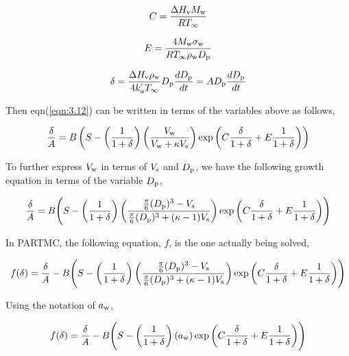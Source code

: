 \documentclass[12pt]{article}
\begin{document}
\begin{equation}\label{eqn:5.5}
C=\frac{\Delta H_{\rm v} M_{\rm w}}{R T_{\infty}}
\end{equation}

\begin{equation}\label{eqn:5.6}
E=\frac{4 M_{\rm w}\sigma_{\rm w}}{R T_{\infty} \rho_{\rm w} D_{\rm p}}
\end{equation}

\begin{equation}\label{eqn:5.7}
\delta=\frac{\Delta H_{\rm v} \rho_{\rm w}}{4 k_a^{'} T_{\infty}} D_{\rm p} \frac{d D_{\rm p}}{dt}=A D_{\rm p} \frac{d D_{\rm p}}{dt}
\end{equation}

Then eqn(\ref{eqn:3.12}) can be written in terms of the variables above as follows,

\begin{equation}\label{eqn:5.8}
\frac{\delta}{A}=B \left(S-\left(\frac{1}{1+\delta}\right) \left(\frac{V_{\rm w}}{V_{\rm w}+\kappa V_{\rm s}}\right)\exp{\left(C \frac{\delta}{1+\delta} +E \frac{1}{1+\delta}\right)}\right)
\end{equation}

To further express $V_{\rm w}$ in terms of $V_{\rm s}$ and $ D_{\rm p}$, we have the following growth equation in terms of the variable $D_{\rm p}$,

\begin{equation}\label{eqn:5.9}
\frac{\delta}{A}=B \Bigg(S-\left(\frac{1}{1+\delta}\right) \left(\frac{\frac{\pi}{6}(D_{\rm p})^{3}-V_{\rm s}} {\frac{\pi}{6}(D_{\rm p})^{3}+(\kappa-1)V_{\rm s}}\right)\exp{\left(C \frac{\delta}{1+\delta} +E \frac{1}{1+\delta}\right)} \Bigg)
\end{equation}

In PARTMC, the following equation, $f$, is the one actually being solved,

\begin{equation}\label{eqn:5.10}
f(\delta)=\frac{\delta}{A}-B \Bigg(S-\left(\frac{1}{1+\delta}\right) \left(\frac{\frac{\pi}{6}(D_{\rm p})^{3}-V_{\rm s}} {\frac{\pi}{6}(D_{\rm p})^{3}+(\kappa-1)V_{\rm s}}\right)\exp{\left(C \frac{\delta}{1+\delta} +E \frac{1}{1+\delta}\right)} \Bigg)
\end{equation}

Using the notation of $a_{\rm w}$,

\begin{equation}\label{eqn:5.11}
f(\delta)=\frac{\delta}{A}-B \Bigg(S-\left(\frac{1}{1+\delta}\right) (a_{\rm w}) \exp{\left(C \frac{\delta}{1+\delta} +E \frac{1}{1+\delta}\right)} \Bigg)
\end{equation}
\end{document}
